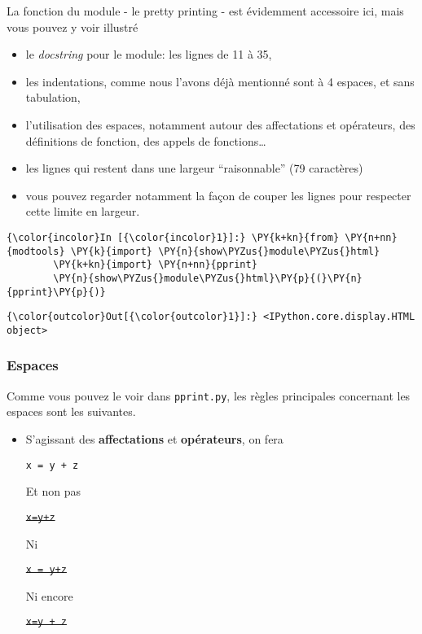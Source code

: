 La fonction du module - le pretty printing - est évidemment accessoire
ici, mais vous pouvez y voir illustré

\begin{itemize}
\tightlist
\item
  le \emph{docstring} pour le module: les lignes de 11 à 35,
\item
  les indentations, comme nous l'avons déjà mentionné sont à 4 espaces,
  et sans tabulation,
\item
  l'utilisation des espaces, notamment autour des affectations et
  opérateurs, des définitions de fonction, des appels de
  fonctions\ldots{}
\item
  les lignes qui restent dans une largeur ``raisonnable'' (79
  caractères)
\item
  vous pouvez regarder notamment la façon de couper les lignes pour
  respecter cette limite en largeur.
\end{itemize}

    \begin{Verbatim}[commandchars=\\\{\},frame=single,framerule=0.3mm,rulecolor=\color{cellframecolor}]
{\color{incolor}In [{\color{incolor}1}]:} \PY{k+kn}{from} \PY{n+nn}{modtools} \PY{k}{import} \PY{n}{show\PYZus{}module\PYZus{}html}
        \PY{k+kn}{import} \PY{n+nn}{pprint}
        \PY{n}{show\PYZus{}module\PYZus{}html}\PY{p}{(}\PY{n}{pprint}\PY{p}{)}
\end{Verbatim}


\begin{Verbatim}[commandchars=\\\{\},frame=single,framerule=0.3mm,rulecolor=\color{cellframecolor}]
{\color{outcolor}Out[{\color{outcolor}1}]:} <IPython.core.display.HTML object>
\end{Verbatim}
            
    \hypertarget{espaces}{%
\subsubsection{Espaces}\label{espaces}}

    Comme vous pouvez le voir dans \texttt{pprint.py}, les règles
principales concernant les espaces sont les suivantes.

    \begin{itemize}
\item
  S'agissant des \textbf{affectations} et \textbf{opérateurs}, on fera

  \texttt{x\ =\ y\ +\ z}

  Et non pas

  \sout{\texttt{x=y+z}}

  Ni

  \sout{\texttt{x\ =\ y+z}}

  Ni encore

  \sout{\texttt{x=y\ +\ z}}
\end{itemize}


